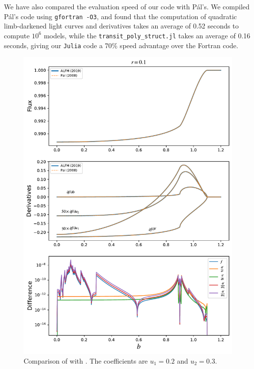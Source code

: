 \documentclass[modern,trackchanges]{aastex63}
\begin{document}
We have also compared the evaluation speed of our code with P\'al's.
We compiled P\'al's code using \texttt{gfortran -O3}, and found that
the computation of quadratic limb-darkened light curves and
derivatives takes an average of 0.52 seconds to compute $10^6$ models,
while the \texttt{transit\_poly\_struct.jl} takes an average of 0.16 seconds,
giving our \texttt{Julia} code a 70\% speed advantage over the Fortran code.

\begin{figure}[p!]
    \begin{centering}
    \includegraphics[width=\linewidth]{figures/julia/compare_pal.pdf}
    \caption{Comparison of \citet{Pal2008} with \thiswork.  The
    coefficients are $u_1=0.2$ and $u_2=0.3$. 
    \label{fig:Pal_comparison}}
    \end{centering}
\end{figure}
\end{document}
